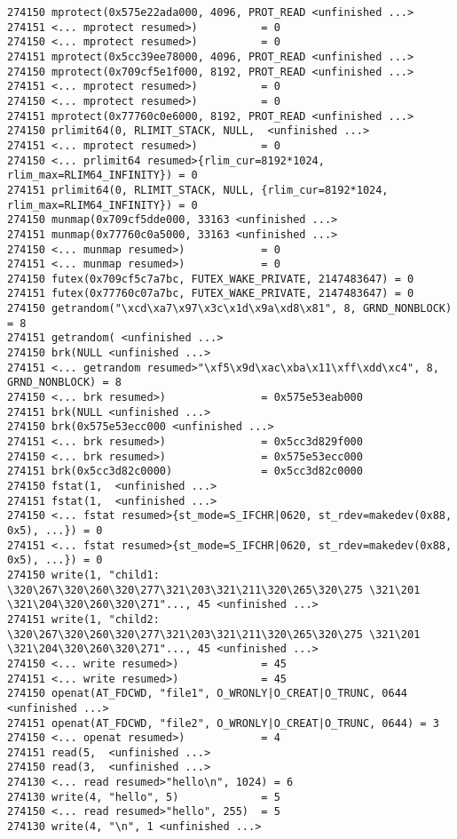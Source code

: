 \begin{verbatim}
274150 mprotect(0x575e22ada000, 4096, PROT_READ <unfinished ...>
274151 <... mprotect resumed>)          = 0
274150 <... mprotect resumed>)          = 0
274151 mprotect(0x5cc39ee78000, 4096, PROT_READ <unfinished ...>
274150 mprotect(0x709cf5e1f000, 8192, PROT_READ <unfinished ...>
274151 <... mprotect resumed>)          = 0
274150 <... mprotect resumed>)          = 0
274151 mprotect(0x77760c0e6000, 8192, PROT_READ <unfinished ...>
274150 prlimit64(0, RLIMIT_STACK, NULL,  <unfinished ...>
274151 <... mprotect resumed>)          = 0
274150 <... prlimit64 resumed>{rlim_cur=8192*1024, rlim_max=RLIM64_INFINITY}) = 0
274151 prlimit64(0, RLIMIT_STACK, NULL, {rlim_cur=8192*1024, rlim_max=RLIM64_INFINITY}) = 0
274150 munmap(0x709cf5dde000, 33163 <unfinished ...>
274151 munmap(0x77760c0a5000, 33163 <unfinished ...>
274150 <... munmap resumed>)            = 0
274151 <... munmap resumed>)            = 0
274150 futex(0x709cf5c7a7bc, FUTEX_WAKE_PRIVATE, 2147483647) = 0
274151 futex(0x77760c07a7bc, FUTEX_WAKE_PRIVATE, 2147483647) = 0
274150 getrandom("\xcd\xa7\x97\x3c\x1d\x9a\xd8\x81", 8, GRND_NONBLOCK) = 8
274151 getrandom( <unfinished ...>
274150 brk(NULL <unfinished ...>
274151 <... getrandom resumed>"\xf5\x9d\xac\xba\x11\xff\xdd\xc4", 8, GRND_NONBLOCK) = 8
274150 <... brk resumed>)               = 0x575e53eab000
274151 brk(NULL <unfinished ...>
274150 brk(0x575e53ecc000 <unfinished ...>
274151 <... brk resumed>)               = 0x5cc3d829f000
274150 <... brk resumed>)               = 0x575e53ecc000
274151 brk(0x5cc3d82c0000)              = 0x5cc3d82c0000
274150 fstat(1,  <unfinished ...>
274151 fstat(1,  <unfinished ...>
274150 <... fstat resumed>{st_mode=S_IFCHR|0620, st_rdev=makedev(0x88, 0x5), ...}) = 0
274151 <... fstat resumed>{st_mode=S_IFCHR|0620, st_rdev=makedev(0x88, 0x5), ...}) = 0
274150 write(1, "child1: \320\267\320\260\320\277\321\203\321\211\320\265\320\275 \321\201 \321\204\320\260\320\271"..., 45 <unfinished ...>
274151 write(1, "child2: \320\267\320\260\320\277\321\203\321\211\320\265\320\275 \321\201 \321\204\320\260\320\271"..., 45 <unfinished ...>
274150 <... write resumed>)             = 45
274151 <... write resumed>)             = 45
274150 openat(AT_FDCWD, "file1", O_WRONLY|O_CREAT|O_TRUNC, 0644 <unfinished ...>
274151 openat(AT_FDCWD, "file2", O_WRONLY|O_CREAT|O_TRUNC, 0644) = 3
274150 <... openat resumed>)            = 4
274151 read(5,  <unfinished ...>
274150 read(3,  <unfinished ...>
274130 <... read resumed>"hello\n", 1024) = 6
274130 write(4, "hello", 5)             = 5
274150 <... read resumed>"hello", 255)  = 5
274130 write(4, "\n", 1 <unfinished ...>

\end{verbatim}
